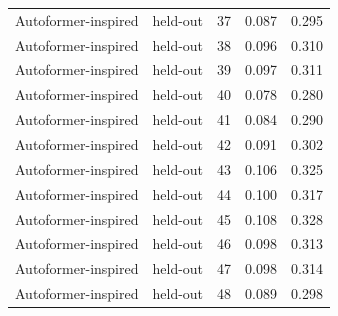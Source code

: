 \begin{tabular}{llrrr}
Autoformer-inspired & held-out & 37 & 0.087 & 0.295 \\
Autoformer-inspired & held-out & 38 & 0.096 & 0.310 \\
Autoformer-inspired & held-out & 39 & 0.097 & 0.311 \\
Autoformer-inspired & held-out & 40 & 0.078 & 0.280 \\
Autoformer-inspired & held-out & 41 & 0.084 & 0.290 \\
Autoformer-inspired & held-out & 42 & 0.091 & 0.302 \\
Autoformer-inspired & held-out & 43 & 0.106 & 0.325 \\
Autoformer-inspired & held-out & 44 & 0.100 & 0.317 \\
Autoformer-inspired & held-out & 45 & 0.108 & 0.328 \\
Autoformer-inspired & held-out & 46 & 0.098 & 0.313 \\
Autoformer-inspired & held-out & 47 & 0.098 & 0.314 \\
Autoformer-inspired & held-out & 48 & 0.089 & 0.298 \\
\bottomrule
\end{tabular}
